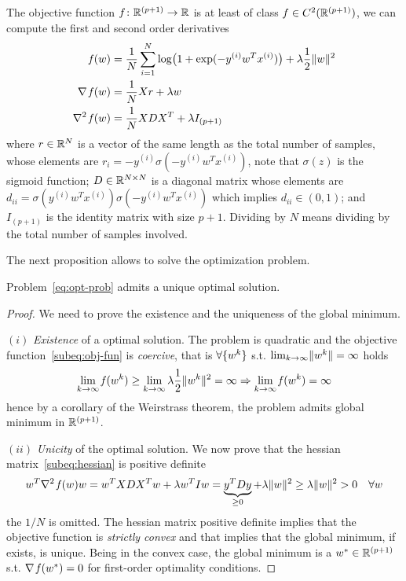 The objective function $f\colon\mathbb{R}^{(p+1)}\to\mathbb{R}$ is at least of class $f\in C^2(\mathbb{R}^{(p+1)})$, we can compute the first and second order derivatives
\begin{subequations}\label{eq:f-df-ddf}
\begin{align}
\operatorname*{\mathit{f}}(w) &= \frac{1}{N}\sum_{i=1}^N\log\bigl(1+\exp(-y^{(i)}w^Tx^{(i)})\bigr)+\lambda\frac{1}{2}\lVert w\rVert^2 \label{subeq:obj-fun} \\
\nabla\operatorname*{\mathit{f}}(w) &= \frac{1}{N}Xr+\lambda w \label{subeq:jacobian} \\
\nabla^2\operatorname*{\mathit{f}}(w) &= \frac{1}{N}XDX^T+\lambda I_{(p+1)}\label{subeq:hessian}
\end{align}
\end{subequations}
where $r\in\mathbb{R}^N$ is a vector of the same length as the total number of samples, whose elements are $r_i=-y^{(i)}\sigma(-y^{(i)}w^Tx^{(i)})$, note that $\sigma(z)$ is the sigmoid function; $D\in\mathbb{R}^{N\times N}$ is a diagonal matrix whose elements are $d_{ii}=\sigma(y^{(i)}w^Tx^{(i)})\sigma(-y^{(i)}w^Tx^{(i)})$ which implies $d_{ii}\in(0,1)$; and $I_{(p+1)}$ is the identity matrix with size $p+1$. Dividing by $N$ means dividing by the total number of samples involved.

The next proposition allows to solve the optimization problem.

\begin{prop}
Problem~\eqref{eq:opt-prob} admits a unique optimal solution.
\end{prop}
\begin{proof}
We need to prove the existence and the uniqueness of the global minimum.

\noindent$(i)$ \emph{Existence} of a optimal solution. The problem is quadratic and the objective function~\eqref{subeq:obj-fun} is \emph{coercive}, that is $\forall\{w^k\}$ s.t. $\lim_{k\to\infty}\lVert w^k\rVert=\infty$ holds
\[
\lim_{k\to\infty}\operatorname*{\mathit{f}}(w^k)\geq\lim_{k\to\infty}\lambda\frac{1}{2}\lVert w^k\rVert^2=\infty\Rightarrow\lim_{k\to\infty}\operatorname*{\mathit{f}}(w^k)=\infty
\]
hence by a corollary of the Weirstrass theorem, the problem admits global minimum in $\mathbb{R}^{(p+1)}$.

\noindent$(ii)$ \emph{Unicity} of the optimal solution. We now prove that the hessian matrix~\eqref{subeq:hessian} is positive definite
\[
w^T\nabla^2\operatorname*{\mathit{f}}(w)w=w^TXDX^Tw+\lambda w^TIw=\underbrace{y^TDy}_{\geq0}+\lambda\lVert w\rVert^2\geq\lambda\lVert w\rVert^2>0\quad\forall w
\]
the $1/N$ is omitted. The hessian matrix positive definite implies that the objective function is \emph{strictly convex} and that implies that the global minimum, if exists, is unique. Being in the convex case, the global minimum is a $w^\ast\in\mathbb{R}^{(p+1)}$ s.t. $\nabla\operatorname*{\mathit{f}}(w^\ast)=0$ for first-order optimality conditions.\qedhere
\end{proof}

